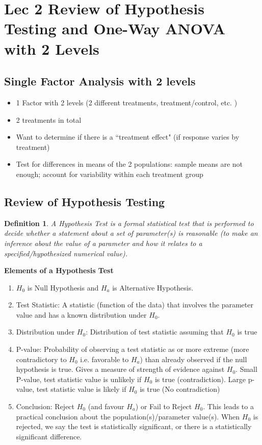 \documentclass[a4paper,11pt]{article}
\newtheorem{defn}[thm]{Definition}
\begin{document}
\newpage

\section{Lec 2 Review of Hypothesis Testing and One-Way ANOVA with 2 Levels}
\subsection{Single Factor Analysis with 2 levels}
\begin{itemize}
\item 1 Factor with 2 levels (2 different treatments, treatment/control, etc. )
\item 2 treatments in total
\item Want to determine if there is a ``treatment effect" (if response varies by treatment)
\item Test for differences in means of the 2 populations: sample means are not enough; account for variability within each treatment group
\end{itemize}

\subsection{Review of Hypothesis Testing}
\begin{defn}
\normalfont
A Hypothesis Test is a formal statistical test that is performed to decide whether a statement about a set of parameter(s) is reasonable (to make an inference about the value of a parameter and how it relates to a specified/hypothesized numerical value). 
\end{defn}
\textbf{Elements of a Hypothesis Test}
\begin{enumerate}
\item $H_0$ is Null Hypothesis and $H_a$ is Alternative Hypothesis. 
\item Test Statistic: A statistic (function of the data) that involves the parameter value and has a known distribution under $H_0$.
\item Distribution under $H_0$: Distribution of test statistic assuming that $H_0$ is true
\item P-value: Probability of observing a test statistic as or more extreme (more contradictory to $H_0$ i.e. favorable to $H_a$) than already observed if the null hypothesis is true. Gives a measure of strength of evidence against $H_0$. Small P-value, test statistic value is unlikely if $H_0$ is true (contradiction). Large p-value, test statistic value is likely if $H_0$ is true (No contradiction)
\item Conclusion: Reject $H_0$ (and favour $H_a$) or Fail to Reject $H_0$. This leads to a practical conclusion about the population(s)/parameter value(s). When $H_0$ is rejected, we say the test is {statistically significant}, or there is a {statistically significant difference}. 
\end{enumerate}
\end{document}

